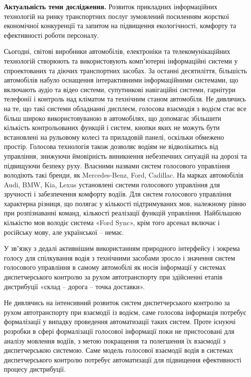 \textbf{Актуальність теми дослідження.} Розвиток прикладних інформаційних технологій на ринку транспортних послуг зумовлений посиленням жорсткої економічної конкуренції та запитом на підвищення екологічності, комфорту та ефективності роботи персоналу.

\ifsynopsis
\else
Сьогодні, світові виробники автомобілів, електроніки та телекомунікаційних технологій створюють та використовують компʼютерні інформаційні системи у спроектованих та діючих транспортних засобах. За останні десятиліття, більшість автомобілів набуло оснащення інтерактивними інформаційними системами, що включають аудіо та відео системи, супутникові навігаційні системи, гарнітури телефонії і контроль над кліматом та технічним станом автомобіля. Не дивлячись на те, що такі системи обладнанні дисплеєм, голосова взаємодія з водієм стає все більш широко використовуваною в автомобілях, що допомагає збільшити кількість контрольованих функцій і систем, кнопки яких не можуть бути встановлені на рульовому колесі та приладовій панелі, оскільки обмежено простір. Голосова технологія також дозволяє водіям не відволікатись від управління, знижуючи ймовірність виникнення небезпечних ситуацій на дорозі та підвищуючи безпеку руху. Власними назвами систем голосового управління володіють такі бренди, як Mercedes-Benz, Ford, Cadillac. На марках автомобілів Audi, BMW, Kia, Lexus установлені системи голосового управління для зручності і забезпечення комфорту водіїв. Для систем голосового управління характерна різниця, що полягає у кількості підтримуваних мов, належному рівню при розпізнаванні команд, кількості реалізації функцій управління. Найбільшою кількістю мов володіє система «Ford Sync», крім того арсенал включає і російську мову, але української – немає.
\fi

У звʼязку з дедалі активнішим використанням природного інтерфейсу і зокрема голосу для спілкування водія з технічними засобами зросло і значення систем голосового управління в самому автомобілі як носія інформації у системах диспетчерського контролю за рухом автотранспорту при здійсненні етапів дистрибуції «склад – дорога – точка доставки».

Не дивлячись на інтенсивний розвиток систем диспетчерського контролю за рухом автотранспорту при взаємодії із водієм, саме голосова інформація потребує формалізації у випадку проведення автоматизації таких систем. Проте існуючі розробки в сфері формалізації голосової інформації поки не пристосовані для аналізу мовлення водіїв, з метою покращення та полегшення їх взаємодії з диспетчерською системою. Саме модель голосової взаємодії водія в системах диспетчерського контролю потребує автоматизації для підвищення ефективності процесу дистрибуції.

